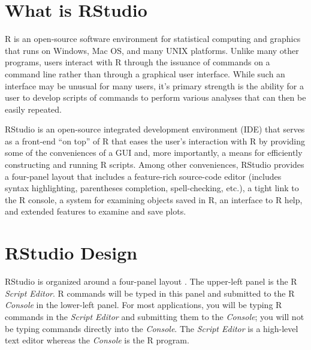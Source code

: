 \documentclass{article}\usepackage[]{graphicx}\usepackage[]{color}
\begin{document}
\section{What is RStudio}
\vspace{-12pt}
R is an open-source software environment for statistical computing and graphics that runs on Windows, Mac OS, and many UNIX platforms.  Unlike many other programs, users interact with R through the issuance of commands on a command line rather than through a graphical user interface.    While such an interface may be unusual for many users, it's primary strength is the ability for a user to develop scripts of commands to perform various analyses that can then be easily repeated.

RStudio is an open-source integrated development environment (IDE) that serves as a front-end ``on top'' of R that eases the user's interaction with R by providing some of the conveniences of a GUI and, more importantly, a means for efficiently constructing and running R scripts.  Among other conveniences, RStudio provides a four-panel layout that includes a feature-rich source-code editor (includes syntax highlighting, parentheses completion, spell-checking, etc.), a tight link to the R console, a system for examining objects saved in R, an interface to R help, and extended features to examine and save plots.


\section{RStudio Design}
\vspace{-12pt}
RStudio is organized around a four-panel layout .  The upper-left panel is the R \textit{Script Editor}.  R commands will be typed in this panel and submitted to the R \textit{Console} in the lower-left panel.  For most applications, you will be typing R commands in the \textit{Script Editor} and submitting them to the \textit{Console}; you will not be typing commands directly into the \textit{Console}.  The \textit{Script Editor} is a high-level text editor whereas the \textit{Console} is the R program.
\end{document}

